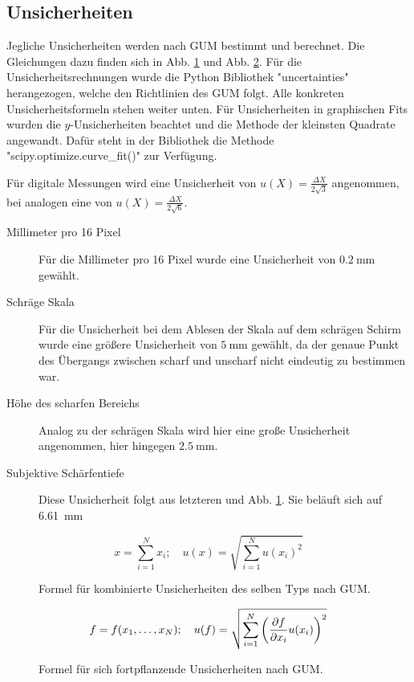 \subsection{Unsicherheiten}\label{subsec:unc}

Jegliche Unsicherheiten werden nach GUM bestimmt und berechnet.
Die Gleichungen dazu finden sich in Abb. \ref{fig:GUM_combine} und Abb. \ref{fig:GUM_formula}.
Für die Unsicherheitsrechnungen wurde die Python Bibliothek "uncertainties" herangezogen, welche den Richtlinien des GUM folgt.
Alle konkreten Unsicherheitsformeln stehen weiter unten.
Für Unsicherheiten in graphischen Fits wurden die $y$-Unsicherheiten beachtet und die Methode der kleinsten Quadrate angewandt.
Dafür steht in der Bibliothek die Methode "scipy.optimize.curve\_fit()" zur Verfügung.

Für digitale Messungen wird eine Unsicherheit von $u(X) = \frac{\Delta X}{2\sqrt{3}}$ angenommen, bei analogen eine von $u(X) = \frac{\Delta X}{2\sqrt{6}}$.

\begin{description}
	\item[Millimeter pro 16 Pixel] Für die Millimeter pro 16 Pixel wurde eine Unsicherheit von $\SI{0,2}{\milli\meter}$ gewählt.
	\item[Schräge Skala] Für die Unsicherheit bei dem Ablesen der Skala auf dem schrägen Schirm wurde eine größere Unsicherheit von $\SI{5}{\milli\meter}$ gewählt, da der genaue Punkt des Übergangs zwischen scharf und unscharf nicht eindeutig zu bestimmen war.
	\item[Höhe des scharfen Bereichs] Analog zu der schrägen Skala wird hier eine große Unsicherheit angenommen, hier hingegen $\SI{2,5}{\milli\meter}$.
	\item[Subjektive Schärfentiefe] Diese Unsicherheit folgt aus letzteren und Abb. \ref{fig:GUM_combine}.
	Sie beläuft sich auf \SI{6,61}{\milli\meter}		
	
\end{description}
\begin{figure}[ht]
	\begin{equation*}	
		x = \sum_{i=1}^{N} x_i
		;\quad
		u(x) = \sqrt{\sum_{i = 1}^{N} u(x_i)^2}
	\end{equation*}
	\caption{Formel für kombinierte Unsicherheiten des selben Typs nach GUM.}
	\label{fig:GUM_combine}
\end{figure}

\begin{figure}[ht]
	\begin{align*}
		f = f(x_1, \dots , x_N)
		;\quad
		u(f) = \sqrt{\sum_{i = 1}^{N}\left(\pdv{f}{x_i} u(x_i)\right) ^2}
	\end{align*}
	\caption{Formel für sich fortpflanzende Unsicherheiten nach GUM.}
	\label{fig:GUM_formula}
\end{figure}


